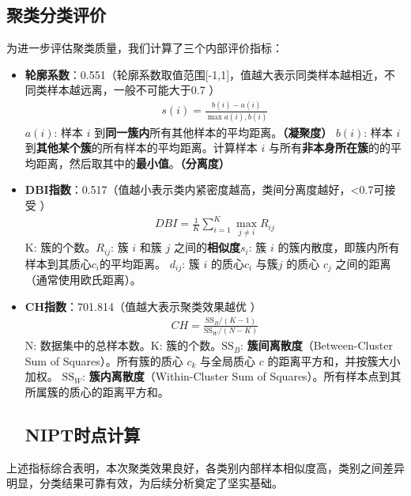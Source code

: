 \documentclass{article}
\begin{document}
\subsection{\textbf{聚类分类评价}}
为进一步评估聚类质量，我们计算了三个内部评价指标：
\begin{itemize}
    \item \textbf{轮廓系数}：0.551（轮廓系数取值范围[-1,1]，值越大表示同类样本越相近，不同类样本越远离，一般不可能大于0.7 ）
          \begin{gather}
              s(i)=\frac{b(i)-a(i)}{\max{a(i),b(i)}} \tag{5}
          \end{gather}
          \( a(i) \): 样本 \( i \) 到\textbf{同一簇内}所有其他样本的平均距离。\textbf{（凝聚度）}
          \textbf{\( b(i) \)}: 样本 \( i \) 到\textbf{其他某个簇}的所有样本的平均距离。计算样本 \( i \)
          与所有\textbf{非本身所在簇}的的平均距离，然后取其中的\textbf{最小值}。\textbf{（分离度）}

    \item \textbf{DBI指数}：0.517（值越小表示类内紧密度越高，类间分离度越好，<0.7可接受 ）
          \begin{gather}
              DBI = \frac{1}{K} \sum_{i=1}^{K} \max_{j \neq i} R_{ij} \tag{6}
          \end{gather}
          K: 簇的个数。$R_{ij}$: 簇 $i$ 和簇 $j$ 之间的\textbf{相似度}$s_i$: 簇 $i$ 的簇内散度，即簇内所有样本到其质心$c_i$的平均距离。
          $d_{ij}$: 簇 $i$ 的质心$ c_i$ 与簇$j$ 的质心 $c_j$ 之间的距离（通常使用欧氏距离）。

    \item \textbf{CH指数}：701.814（值越大表示聚类效果越优 ）
          \begin{gather}
              CH = \frac{\text{SS}_B / (K - 1)}{\text{SS}_W / (N - K)} \tag{7}
          \end{gather}
          N: 数据集中的总样本数。K: 簇的个数。$\text{SS}_B$: \textbf{簇间离散度}（Between-Cluster Sum
          of Squares）。所有簇的质心 $c_k$ 与全局质心 $c$ 的距离平方和，并按簇大小加权。
          $\text{SS}_W$: \textbf{簇内离散度}（Within-Cluster Sum of Squares）。所有样本点到其所属簇的质心的距离平方和。

          \subsection{\textbf{NIPT时点计算}}

\end{itemize}
上述指标综合表明，本次聚类效果良好，各类别内部样本相似度高，类别之间差异明显，分类结果可靠有效，为后续分析奠定了坚实基础。
\end{document}
